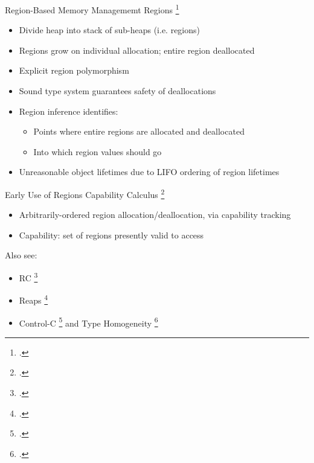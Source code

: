 \documentclass[aspectratio=169]{beamer}
\begin{document}
\begin{frame}{Region-Based Memory Managememt}
    Regions \footcite{tofte_region-based_1997}
    \begin{itemize}[<+->]
        \item Divide heap into stack of sub-heaps (i.e. regions) 
        \item Regions grow on individual allocation; \alert{entire} region deallocated 
        \item Explicit region polymorphism 
        \item Sound type system \alert{guarantees safety} of deallocations 
        \item Region inference identifies:
            \begin{itemize}
                \item Points where entire regions are allocated and deallocated
                \item Into which region values should go
            \end{itemize}
        \item Unreasonable object lifetimes due to LIFO ordering of region lifetimes %
    \end{itemize}
    \vspace{0.1in}
\end{frame}

\begin{frame}{Early Use of Regions}
Capability Calculus \footcite{crary_typed_1999}
    \vspace{-0.1in}
    \begin{itemize}
        \item Arbitrarily-ordered region allocation/deallocation, via capability tracking
        \item Capability: set of regions presently valid to access
    \end{itemize}
\pause
Also see:
    \begin{itemize}
        \item RC \footcite{gay_language_2001}
        \item Reaps \footcite{berger_reconsidering_2002}
        \item Control-C \footcite{kowshik_ensuring_2002} and Type Homogeneity \footcite{dhurjati_memory_2003}
   \end{itemize}
\end{frame}
\end{document}

